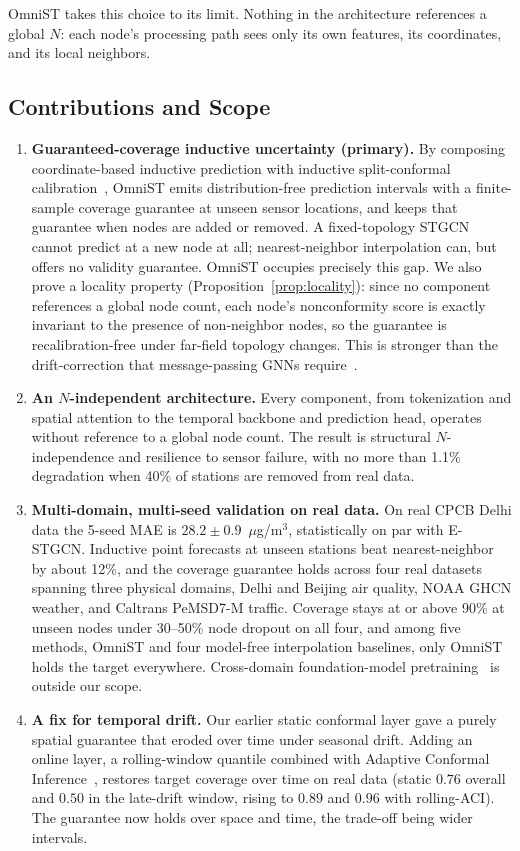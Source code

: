 \documentclass[journal]{IEEEtran}
\begin{document}
OmniST takes this choice to its limit. Nothing in the architecture references a global $N$: each node's processing path sees only its own features, its coordinates, and its local neighbors.

\subsection{Contributions and Scope}

\begin{enumerate}
\item \textbf{Guaranteed-coverage inductive uncertainty (primary).} By composing coordinate-based inductive prediction with inductive split-conformal calibration~\cite{conformalinductivegnn2024}, OmniST emits distribution-free prediction intervals with a finite-sample coverage guarantee at unseen sensor locations, and keeps that guarantee when nodes are added or removed. A fixed-topology STGCN cannot predict at a new node at all; nearest-neighbor interpolation can, but offers no validity guarantee. OmniST occupies precisely this gap. We also prove a locality property (Proposition~\ref{prop:locality}): since no component references a global node count, each node's nonconformity score is exactly invariant to the presence of non-neighbor nodes, so the guarantee is recalibration-free under far-field topology changes. This is stronger than the drift-correction that message-passing GNNs require~\cite{conformalinductivegnn2024}.
\item \textbf{An $N$-independent architecture.} Every component, from tokenization and spatial attention to the temporal backbone and prediction head, operates without reference to a global node count. The result is structural $N$-independence and resilience to sensor failure, with no more than 1.1\% degradation when 40\% of stations are removed from real data.
\item \textbf{Multi-domain, multi-seed validation on real data.} On real CPCB Delhi data the 5-seed MAE is $28.2\pm0.9$~$\mu$g/m$^3$, statistically on par with E-STGCN. Inductive point forecasts at unseen stations beat nearest-neighbor by about 12\%, and the coverage guarantee holds across four real datasets spanning three physical domains, Delhi and Beijing air quality, NOAA GHCN weather, and Caltrans PeMSD7-M traffic. Coverage stays at or above 90\% at unseen nodes under 30--50\% node dropout on all four, and among five methods, OmniST and four model-free interpolation baselines, only OmniST holds the target everywhere. Cross-domain foundation-model pretraining~\cite{dambast2026} is outside our scope.
\item \textbf{A fix for temporal drift.} Our earlier static conformal layer gave a purely spatial guarantee that eroded over time under seasonal drift. Adding an online layer, a rolling-window quantile combined with Adaptive Conformal Inference~\cite{gibbs2021aci}, restores target coverage over time on real data (static $0.76$ overall and $0.50$ in the late-drift window, rising to $0.89$ and $0.96$ with rolling-ACI). The guarantee now holds over space and time, the trade-off being wider intervals.
\end{enumerate}
\end{document}
